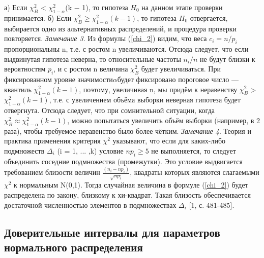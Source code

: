 \documentclass[12pt,a4paper]{scrartcl}
\begin{document}
    а) Если $\chi^{2}_{B}$ < $\chi^{2}_{1-\alpha}$(k $-$ 1), то гипотеза $H_{0}$ на данном этапе проверки принимается. 
    \newline
    б) Если $\chi^{2}_{B} \geq \chi^{2}_{1-\alpha}(k -1)$, то гипотеза $H_{0}$ отвергается, выбирается одно из альтернативных распределений, и процедура проверки повторяется.
    \newline
    \textit{Замечание 3}. Из формулы (\ref{chi_2}) видим, что веса $c_{i} = n/p_{i}$ пропорциональны n, т.е. с ростом n увеличиваются. Отсюда следует, что если выдвинутая гипотеза неверна, то относительные частоты $n_{i}/n$ не будут близки к вероятностям $p_{i}$, и с ростом n величина  $\chi^{2}_{B}$  будет увеличиваться. При фиксированном уровне значимости$ \alpha $будет фиксировано пороговое число — квантиль $\chi^{2}_{1-\alpha}(k-1)$, поэтому, увеличивая n, мы придём к неравенству $\chi^{2}_{B}$ > $\chi^{2}_{1-\alpha}(k-1)$, т.е. с увеличением объёма выборки неверная гипотеза будет отвергнута.
    \newline
    Отсюда следует, что при сомнительной ситуации, когда $\chi^{2}_{B} \approx \chi^{2}_{1-\alpha}(k-1)$, можно попытаться увеличить объём выборки (например, в 2 раза), чтобы требуемое неравенство было более чётким.
    \newline
    \textit{Замечание 4}. Теория и практика применения критерия  $\chi^{2}$ указывают, что если для каких-либо подмножеств $\Delta_{i}$ (i = 1, ... ,k) условие $np_{i} \geq 5$ не выполняется, то следует объединить соседние подмножества (промежутки).
    \newline
    Это условие выдвигается требованием близости величин $\frac{(n_{i} -np_{i})}{\sqrt{np_{i}}}$, квадраты которых являются слагаемыми $\chi^{2}$  к нормальным N(0,1). Тогда случайная величина в формуле (\ref{chi_2}) будет распределена по закону, близкому к хи-квадрат. Такая близость обеспечивается достаточной численностью элементов в подмножествах $\Delta_{i}$ [1, с. 481-485].

\subsection{Доверительные интервалы для параметров нормального распределения}
\end{document}
